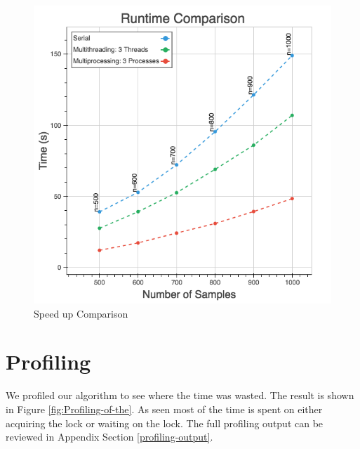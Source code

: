 \documentclass[10pt,twocolumn,letterpaper]{article}
\begin{document}
\begin{figure}[htbp] 
\begin{center}
\includegraphics[scale=0.65]{figure/runtime_comparison.png}
\end{center}
\caption{\label{fig:Speed-up-Comparison}Speed up Comparison}
\end{figure}

\section{Profiling}  \label{profiling}

We profiled our algorithm to see where the time was wasted. The result
is shown in Figure \ref{fig:Profiling-of-the}. As seen most of the
time is spent on either acquiring the lock or waiting on the lock.
The full profiling output can be reviewed in Appendix Section \ref{profiling-output}. 
\end{document}

